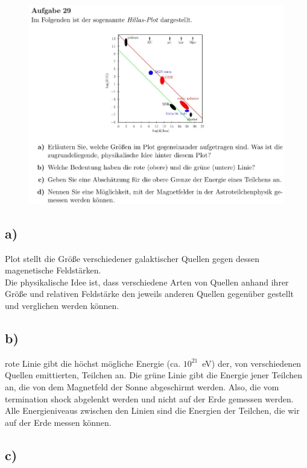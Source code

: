 \begin{figure}[H]
    \centering
    \includegraphics[width=\textwidth]{images/Aufgabe29.jpg}
\end{figure}

\subsection{a)}

    \justifying Plot stellt die Größe verschiedener galaktischer Quellen gegen dessen magenetische Feldstärken.\\
    Die physikalische Idee ist, dass verschiedene Arten von Quellen anhand ihrer Größe und relativen Feldstärke den jeweils anderen
    Quellen gegenüber gestellt und verglichen werden können. 

\subsection{b)}

    \justifying rote Linie gibt die höchst mögliche Energie (ca. $10^{21}$\SI{}{\electronvolt}) der, von verschiedenen Quellen emittierten, Teilchen an. Die grüne
    Linie gibt die Energie jener Teilchen an, die von dem Magnetfeld der Sonne abgeschirmt werden. Also, die vom termination shock abgelenkt werden und nicht auf der Erde gemessen 
    werden. Alle Energieniveaus zwischen den Linien sind die Energien der Teilchen, die wir auf der Erde messen können. 

\subsection{c)}

